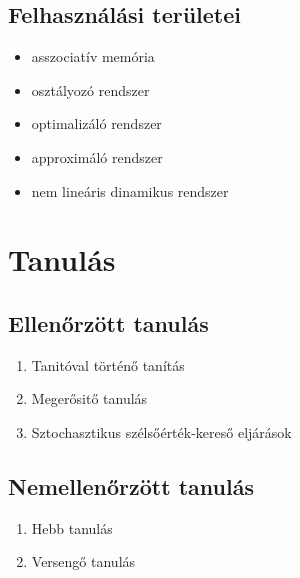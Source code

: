\documentclass[letterpaper,10pt,magyar]{sphinxmanual}
\begin{document}
\section{Felhasználási területei}
\label{\detokenize{pages/neural_network:felhasznalasi-teruletei}}\begin{itemize}
\item {} 
asszociatív memória

\item {} 
osztályozó rendszer

\item {} 
optimalizáló rendszer

\item {} 
approximáló rendszer

\item {} 
nem lineáris dinamikus rendszer

\end{itemize}


\chapter{Tanulás}
\label{\detokenize{pages/learning:tanulas}}\label{\detokenize{pages/learning::doc}}

\section{Ellenőrzött tanulás}
\label{\detokenize{pages/learning:ellenorzott-tanulas}}\begin{enumerate}
\item {} 
Tanitóval történő tanítás

\item {} 
Megerősitő tanulás

\item {} 
Sztochasztikus szélsőérték-kereső eljárások

\end{enumerate}


\section{Nemellenőrzött tanulás}
\label{\detokenize{pages/learning:nemellenorzott-tanulas}}\begin{enumerate}
\item {} 
Hebb tanulás

\item {} 
Versengő tanulás

\end{enumerate}
\end{document}
